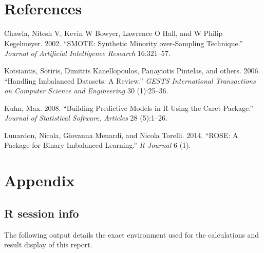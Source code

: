 \documentclass[11pt,]{article}
\begin{document}
\hypertarget{references}{%
\section{References}\label{references}}

\hypertarget{refs}{}
\leavevmode\hypertarget{ref-chawla2002smote}{}%
Chawla, Nitesh V, Kevin W Bowyer, Lawrence O Hall, and W Philip
Kegelmeyer. 2002. ``SMOTE: Synthetic Minority over-Sampling Technique.''
\emph{Journal of Artificial Intelligence Research} 16:321--57.

\leavevmode\hypertarget{ref-kotsiantis2006handling}{}%
Kotsiantis, Sotiris, Dimitris Kanellopoulos, Panayiotis Pintelas, and
others. 2006. ``Handling Imbalanced Datasets: A Review.'' \emph{GESTS
International Transactions on Computer Science and Engineering} 30
(1):25--36.

\leavevmode\hypertarget{ref-JSSv028i05}{}%
Kuhn, Max. 2008. ``Building Predictive Models in R Using the Caret
Package.'' \emph{Journal of Statistical Software, Articles} 28
(5):1--26.

\leavevmode\hypertarget{ref-lunardon2014rose}{}%
Lunardon, Nicola, Giovanna Menardi, and Nicola Torelli. 2014. ``ROSE: A
Package for Binary Imbalanced Learning.'' \emph{R Journal} 6 (1).

\clearpage

\hypertarget{appendix}{%
\section{Appendix}\label{appendix}}

\hypertarget{r-session-info}{%
\subsection{R session info}\label{r-session-info}}

The following output details the exact environment used for the
calculations and result display of this report.
\end{document}
